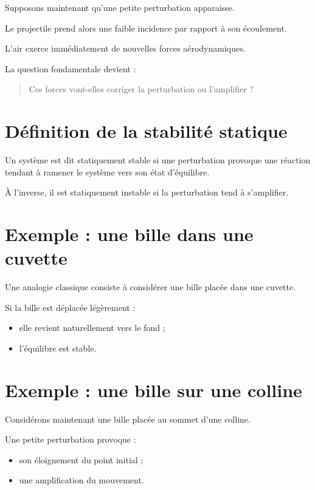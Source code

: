 Supposons maintenant qu'une petite perturbation apparaisse.

Le projectile prend alors une faible incidence par rapport à son écoulement.

L'air exerce immédiatement de nouvelles forces aérodynamiques.

La question fondamentale devient :

\begin{quote}
Ces forces vont-elles corriger la perturbation ou l'amplifier ?
\end{quote}

\section{Définition de la stabilité statique}

Un système est dit statiquement stable si une perturbation provoque une
réaction tendant à ramener le système vers son état d'équilibre.

À l'inverse, il est statiquement instable si la perturbation tend à
s'amplifier.

\section{Exemple : une bille dans une cuvette}

Une analogie classique consiste à considérer une bille placée dans une
cuvette.

Si la bille est déplacée légèrement :

\begin{itemize}
    \item elle revient naturellement vers le fond ;
    \item l'équilibre est stable.
\end{itemize}

\section{Exemple : une bille sur une colline}

Considérons maintenant une bille placée au sommet d'une colline.

Une petite perturbation provoque :

\begin{itemize}
    \item son éloignement du point initial ;
    \item une amplification du mouvement.
\end{itemize}

